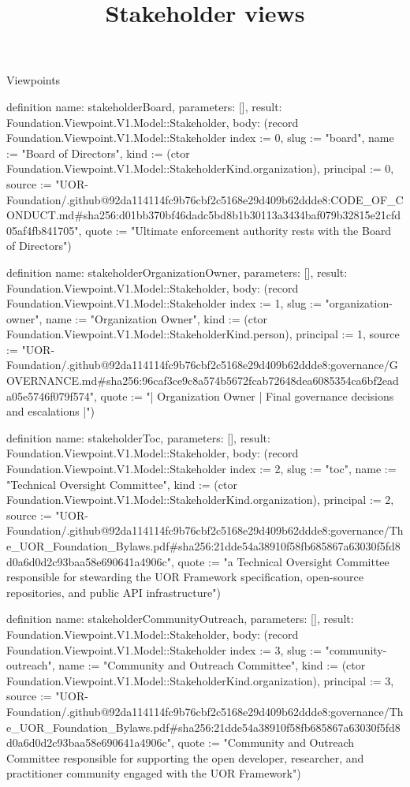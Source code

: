 \begin{lexlean}{Viewpoints}
\title{Stakeholder views}
\begin{semanticmodule}
definition{
  name: stakeholderBoard,
  parameters: [],
  result: Foundation.Viewpoint.V1.Model::Stakeholder,
  body: (record Foundation.Viewpoint.V1.Model::Stakeholder {index := 0, slug := "board", name := "Board of Directors", kind := (ctor Foundation.Viewpoint.V1.Model::StakeholderKind.organization), principal := 0, source := "UOR-Foundation/.github@92da114114fc9b76cbf2c5168e29d409b62ddde8:CODE_OF_CONDUCT.md#sha256:d01bb370bf46dadc5bd8b1b30113a3434baf079b32815e21cfd05af4fb841705", quote := "Ultimate enforcement authority rests with the Board of Directors"})
}

definition{
  name: stakeholderOrganizationOwner,
  parameters: [],
  result: Foundation.Viewpoint.V1.Model::Stakeholder,
  body: (record Foundation.Viewpoint.V1.Model::Stakeholder {index := 1, slug := "organization-owner", name := "Organization Owner", kind := (ctor Foundation.Viewpoint.V1.Model::StakeholderKind.person), principal := 1, source := "UOR-Foundation/.github@92da114114fc9b76cbf2c5168e29d409b62ddde8:governance/GOVERNANCE.md#sha256:96caf3ce9c8a574b5672fcab72648dea6085354ca6bf2eada05e5746f079f574", quote := "| Organization Owner | Final governance decisions and escalations |"})
}

definition{
  name: stakeholderToc,
  parameters: [],
  result: Foundation.Viewpoint.V1.Model::Stakeholder,
  body: (record Foundation.Viewpoint.V1.Model::Stakeholder {index := 2, slug := "toc", name := "Technical Oversight Committee", kind := (ctor Foundation.Viewpoint.V1.Model::StakeholderKind.organization), principal := 2, source := "UOR-Foundation/.github@92da114114fc9b76cbf2c5168e29d409b62ddde8:governance/The_UOR_Foundation_Bylaws.pdf#sha256:21dde54a38910f58fb685867a63030f5fd8d0a6d0d2c93baa58e690641a4906c", quote := "a Technical Oversight Committee responsible for stewarding the UOR Framework specification, open-source repositories, and public API infrastructure"})
}

definition{
  name: stakeholderCommunityOutreach,
  parameters: [],
  result: Foundation.Viewpoint.V1.Model::Stakeholder,
  body: (record Foundation.Viewpoint.V1.Model::Stakeholder {index := 3, slug := "community-outreach", name := "Community and Outreach Committee", kind := (ctor Foundation.Viewpoint.V1.Model::StakeholderKind.organization), principal := 3, source := "UOR-Foundation/.github@92da114114fc9b76cbf2c5168e29d409b62ddde8:governance/The_UOR_Foundation_Bylaws.pdf#sha256:21dde54a38910f58fb685867a63030f5fd8d0a6d0d2c93baa58e690641a4906c", quote := "Community and Outreach Committee responsible for supporting the open developer, researcher, and practitioner community engaged with the UOR Framework"})
}


\end{semanticmodule}
\end{lexlean}
